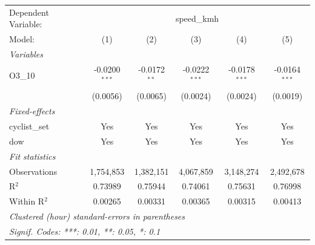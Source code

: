 \begingroup
\centering
\begin{tabular}{lccccc}
   \tabularnewline \midrule \midrule
   Dependent Variable: & \multicolumn{5}{c}{speed\_kmh}\\
   Model:        & (1)             & (2)            & (3)             & (4)             & (5)\\  
   \midrule
   \emph{Variables}\\
   O3\_10        & -0.0200$^{***}$ & -0.0172$^{**}$ & -0.0222$^{***}$ & -0.0178$^{***}$ & -0.0164$^{***}$\\   
                 & (0.0056)        & (0.0065)       & (0.0024)        & (0.0024)        & (0.0019)\\   
   \midrule
   \emph{Fixed-effects}\\
   cyclist\_set  & Yes             & Yes            & Yes             & Yes             & Yes\\  
   dow           & Yes             & Yes            & Yes             & Yes             & Yes\\  
   \midrule
   \emph{Fit statistics}\\
   Observations  & 1,754,853       & 1,382,151      & 4,067,859       & 3,148,274       & 2,492,678\\  
   R$^2$         & 0.73989         & 0.75944        & 0.74061         & 0.75631         & 0.76998\\  
   Within R$^2$  & 0.00265         & 0.00331        & 0.00365         & 0.00315         & 0.00413\\  
   \midrule \midrule
   \multicolumn{6}{l}{\emph{Clustered (hour) standard-errors in parentheses}}\\
   \multicolumn{6}{l}{\emph{Signif. Codes: ***: 0.01, **: 0.05, *: 0.1}}\\
\end{tabular}
\par\endgroup
